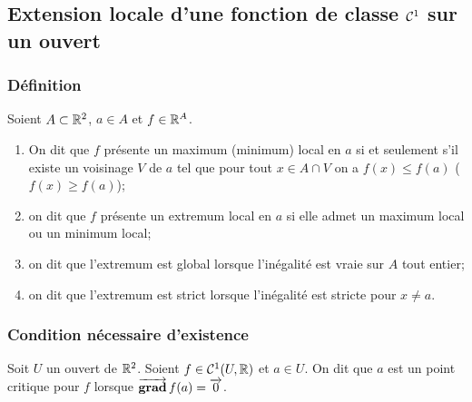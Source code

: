 \subsection{Extension locale d'une fonction de classe \(\mathcal{C}^{1}\) sur
un ouvert}

\subsubsection{Définition}

\begin{defdef}
  Soient \(A \subset \mathbb{R}^2\), \(a \in A\) et \(f \in \mathbb{R}^A\).
  \begin{enumerate}
    \item On dit que \(f\) présente un maximum (minimum) local en \(a\)
      si et seulement s'il existe un voisinage \(V\) de \(a\) tel que
      pour tout \(x \in A \cap V\) on a \(f(x) \leqslant f(a)\) (\(f(x)
      \geqslant f(a)\));
    \item on dit que \(f\) présente un extremum local en \(a\) si elle
      admet un maximum local ou un minimum local;
    \item on dit que l'extremum est global lorsque l'inégalité est vraie
      sur \(A\) tout entier;
    \item on dit que l'extremum est strict lorsque l'inégalité est
      stricte pour \(x \neq a\).
  \end{enumerate}
\end{defdef}

\subsubsection{Condition nécessaire d'existence}

\begin{defdef}
  Soit \(U\) un ouvert de \(\mathbb{R}^2\). Soient \(f \in \mathcal{C}^{1}(U, \mathbb{R})\)
  et \(a \in U\). On dit que \(a\) est un point critique pour \(f\)
  lorsque \(\operatorname{\overrightarrow{\mathbf{grad}}} f(a)=\overrightarrow{0}\).
\end{defdef}

